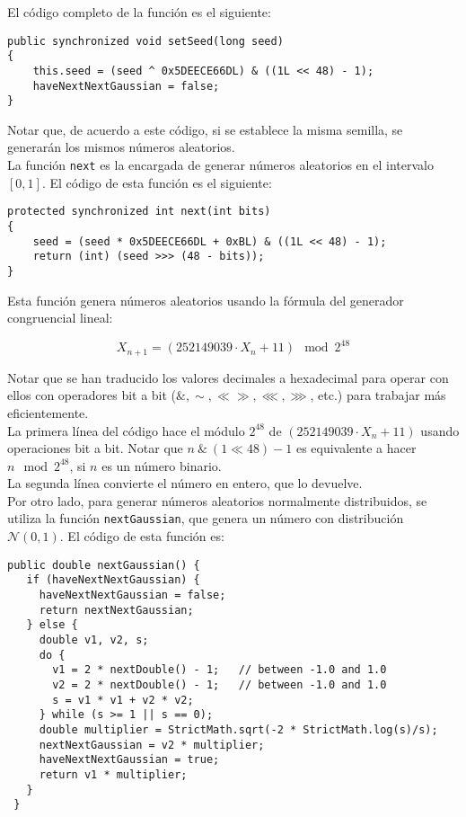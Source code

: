 \documentclass[12pt,a4paper,twoside,openright,titlepage,final]{article}
\begin{document}
El código completo de la función es el siguiente: 

\begin{verbatim}
public synchronized void setSeed(long seed)
{
	this.seed = (seed ^ 0x5DEECE66DL) & ((1L << 48) - 1);
	haveNextNextGaussian = false;
}
\end{verbatim}

Notar que, de acuerdo a este código, si se establece la misma semilla, se generarán los mismos números aleatorios.\\

La función \texttt{next} es la encargada de generar números aleatorios en el intervalo $[0,1]$. El código de esta función es el siguiente:

\begin{verbatim}
protected synchronized int next(int bits)
{
	seed = (seed * 0x5DEECE66DL + 0xBL) & ((1L << 48) - 1);
	return (int) (seed >>> (48 - bits));
}
\end{verbatim}

Esta función genera números aleatorios usando la fórmula del generador congruencial lineal:

\[ X_{n+1} = (252149039 \cdot X_n + 11) \mod 2^{48} \]

Notar que se han traducido los valores decimales a hexadecimal para operar con ellos con operadores bit a bit ($\&,\sim, \ll \gg, \lll, \ggg$, etc.) para trabajar más eficientemente.\\

La primera línea del código hace el módulo $2^{48}$ de $(252149039 \cdot X_n + 11)$ usando operaciones bit a bit. Notar que $n \ \& \ (1 \ll 48) - 1$ es equivalente a hacer $n \mod 2^{48}$, si $n$ es un número binario.\\

La segunda línea convierte el número en entero, que lo devuelve.\\

Por otro lado, para generar números aleatorios normalmente distribuidos, se utiliza la función \texttt{nextGaussian}, que genera un número con distribución $\mathcal{N}(0,1)$. El código de esta función es:

\begin{verbatim}
public double nextGaussian() {
   if (haveNextNextGaussian) {
     haveNextNextGaussian = false;
     return nextNextGaussian;
   } else {
     double v1, v2, s;
     do {
       v1 = 2 * nextDouble() - 1;   // between -1.0 and 1.0
       v2 = 2 * nextDouble() - 1;   // between -1.0 and 1.0
       s = v1 * v1 + v2 * v2;
     } while (s >= 1 || s == 0);
     double multiplier = StrictMath.sqrt(-2 * StrictMath.log(s)/s);
     nextNextGaussian = v2 * multiplier;
     haveNextNextGaussian = true;
     return v1 * multiplier;
   }
 }
\end{verbatim}
\end{document}
